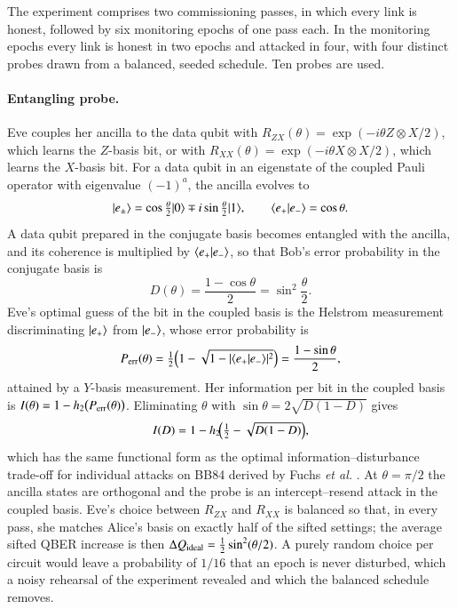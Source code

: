 The experiment comprises two commissioning passes, in which every link is honest, followed by six monitoring epochs of one pass each. In the monitoring epochs every link is honest in two epochs and attacked in four, with four distinct probes drawn from a balanced, seeded schedule. Ten probes are used.

\paragraph{Entangling probe.} Eve couples her ancilla to the data qubit with $R_{ZX}(\theta)=\exp(-i\theta Z\otimes X/2)$, which learns the $Z$-basis bit, or with $R_{XX}(\theta)=\exp(-i\theta X\otimes X/2)$, which learns the $X$-basis bit. For a data qubit in an eigenstate of the coupled Pauli operator with eigenvalue $(-1)^a$, the ancilla evolves to
\begin{equation}
\lvert e_\pm\rangle=\cos\tfrac{\theta}{2}\lvert 0\rangle\mp i\sin\tfrac{\theta}{2}\lvert 1\rangle,\qquad \langle e_+ \vert e_-\rangle=\cos\theta. \label{eq:probestates}
\end{equation}
A data qubit prepared in the conjugate basis becomes entangled with the ancilla, and its coherence is multiplied by $\langle e_+ \vert e_-\rangle$, so that Bob's error probability in the conjugate basis is
\begin{equation}
D(\theta)=\frac{1-\cos\theta}{2}=\sin^2\frac{\theta}{2}. \label{eq:disturb}
\end{equation}
Eve's optimal guess of the bit in the coupled basis is the Helstrom measurement \cite{Helstrom1976} discriminating $\lvert e_+\rangle$ from $\lvert e_-\rangle$, whose error probability is
\begin{equation}
P_{\rm err}(\theta)=\tfrac12\Bigl(1-\sqrt{1-\lvert\langle e_+ \vert e_-\rangle\rvert^2}\Bigr)=\frac{1-\sin\theta}{2}, \label{eq:helstrom}
\end{equation}
attained by a $Y$-basis measurement. Her information per bit in the coupled basis is $I(\theta)=1-h_2\bigl(P_{\rm err}(\theta)\bigr)$. Eliminating $\theta$ with $\sin\theta=2\sqrt{D(1-D)}$ gives
\begin{equation}
I(D)=1-h_2\!\Bigl(\tfrac12-\sqrt{D(1-D)}\Bigr), \label{eq:infodisturb}
\end{equation}
which has the same functional form as the optimal information--disturbance trade-off for individual attacks on BB84 derived by Fuchs \emph{et al.} \cite{Fuchs1997}. At $\theta=\pi/2$ the ancilla states are orthogonal and the probe is an intercept--resend attack in the coupled basis. Eve's choice between $R_{ZX}$ and $R_{XX}$ is balanced so that, in every pass, she matches Alice's basis on exactly half of the sifted settings; the average sifted QBER increase is then $\Delta Q_{\rm ideal}=\tfrac12\sin^2(\theta/2)$. A purely random choice per circuit would leave a probability of $1/16$ that an epoch is never disturbed, which a noisy rehearsal of the experiment revealed and which the balanced schedule removes.

